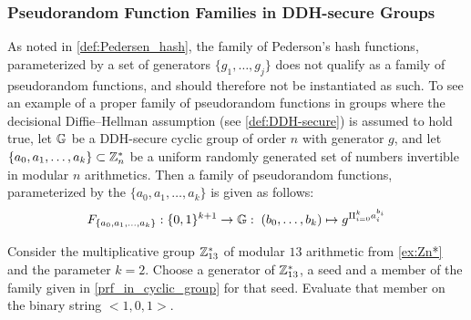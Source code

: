 \subsubsection{Pseudorandom Function Families in DDH-secure Groups}
As noted in \ref{def:Pedersen_hash}, the family of Pederson's hash functions, parameterized by a set of generators $\{g_1,\ldots,g_j\}$ does not qualify as a family of pseudorandom functions, and should therefore not be instantiated as such. To see an example of a proper family of pseudorandom functions in groups where the decisional Diffie--Hellman assumption (see \secname \ref{def:DDH-secure}) is assumed to hold true, let $\mathbb{G}$ be a DDH-secure cyclic group of order $n$ with generator $g$, and let $\{a_0,a_1,\ldots,a_k\}\subset \mathbb{Z}_{n}^*$ be a uniform randomly generated set of numbers invertible in modular $n$ arithmetics. Then a family of pseudorandom functions, parameterized by the  $\{a_0,a_1,\ldots,a_k\}$ is given as follows:
\begin{equation}
\label{prf_in_cyclic_group}
F_{\{a_0,a_1,\ldots,a_k\}}: \{0,1\}^{k+1} \to \mathbb{G}:\; (b_0,\ldots,b_k)\mapsto g^{\Pi_{i=0}^k a_i^{b_i}}
\end{equation}
\begin{exercise} Consider the multiplicative group $\mathbb{Z}_{13}^*$ of modular $13$ arithmetic from \examplename{} \ref{ex:Zn*} and the parameter $k=2$. Choose a generator of $\mathbb{Z}_{13}^*$, a seed and  a member of the family given in \eqref{prf_in_cyclic_group} for that seed. Evaluate that member on the binary string $<1,0,1>$.
\end{exercise}



